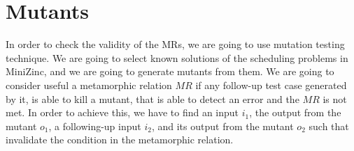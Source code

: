 









\section{Mutants}\label{sec:mutants}
In order to check the validity of the MRs, we are going
to use mutation testing technique. We are going to select known
solutions of the scheduling problems in MiniZinc, and we are going to
generate mutants from them. We are going to consider useful a
metamorphic relation $MR$ if any follow-up test case generated by it,
is able to kill a mutant, that is able to detect an error and the $MR$ 
is not met. In order to achieve this, we have to find
an input $i_{1}$, the output from the mutant $o_{1}$, a following-up input
$i_{2}$, and its output from the mutant $o_{2}$ such that invalidate
the condition in the metamorphic relation.
